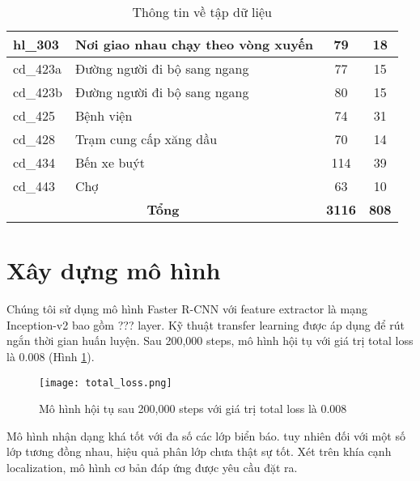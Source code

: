 \documentclass[../thesis.tex]{subfiles}
\begin{document}
\begin{table}[!htb]
\begin{longtable}{| l | l | c | c |}
	\hline
	hl\_303 & Nơi giao nhau chạy theo vòng xuyến & 79 & 18\\
	\hline
	cd\_423a & Đường người đi bộ sang ngang & 77 & 15\\
	\hline
	cd\_423b & Đường người đi bộ sang ngang & 80 & 15\\
	\hline
	cd\_425 & Bệnh viện & 74 & 31\\
	\hline
	cd\_428 & Trạm cung cấp xăng dầu & 70 & 14\\
	\hline
	cd\_434 & Bến xe buýt & 114 & 39\\
	\hline
	cd\_443 & Chợ & 63 & 10\\
	\hline
	\multicolumn{2}{|c|}{\textbf{Tổng}} & \textbf{3116} & \textbf{808}\\
	\hline
\end{longtable}
\caption{Thông tin về tập dữ liệu}
\label{Table:datset}
\end{table}

\section{Xây dựng mô hình}

Chúng tôi sử dụng mô hình Faster R-CNN với feature extractor là mạng Inception-v2 bao gồm ??? layer. Kỹ thuật transfer learning được áp dụng để rút ngắn thời gian huấn luyện.  Sau 200,000 steps, mô hình hội tụ với giá trị total loss là 0.008 (Hình \ref{Fig:total_loss.png}).

\begin{figure}[!htb]
	\centering
	\texttt{[image: total\_loss.png]}
	\caption{Mô hình hội tụ sau 200,000 steps với giá trị total loss là 0.008}\label{Fig:total_loss.png}
\end{figure}


Mô hình nhận dạng khá tốt với đa số các lớp biển báo. tuy nhiên đối với một số lớp tương đồng nhau, hiệu quả phân lớp chưa thật sự tốt. Xét trên khía cạnh localization, mô hình cơ bản đáp ứng được yêu cầu đặt ra.
\end{document}
